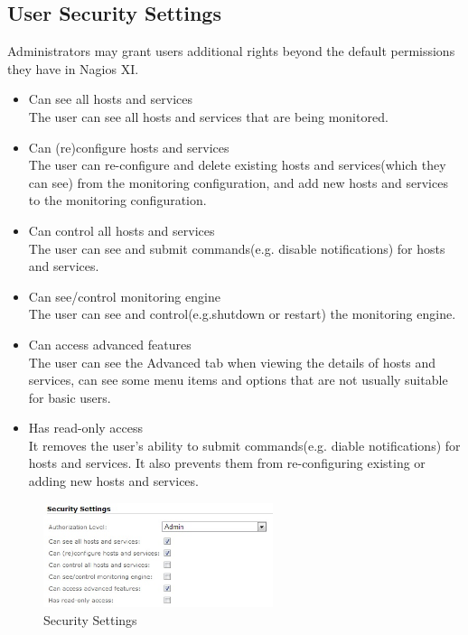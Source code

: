 \subsection{User Security Settings}
Administrators may grant users additional rights beyond the default permissions they have in Nagios XI.
\begin{itemize}
\item Can see all hosts and services \\
The user can see all hosts and services that are being monitored.
\item Can (re)configure hosts and services \\
The user can re-configure and delete existing hosts and services(which they can see) from the monitoring configuration, and add new hosts and services to the monitoring configuration.
\item Can control all hosts and services \\
The user can see and submit commands(e.g. disable notifications) for hosts and services.
\item Can see/control monitoring engine \\
The user can see and control(e.g.shutdown or restart) the monitoring engine.
\item Can access advanced features \\
The user can see the Advanced tab when viewing the details of hosts and services, can see some menu items and options that are not usually suitable for basic users. 
\item Has read-only access \\
It removes the user's ability to submit commands(e.g. diable notifications) for hosts and services. It also prevents them from re-configuring existing or adding new hosts and services.
\end{itemize}
\begin{figure}[htp]
\centering
\includegraphics[width=0.6\textwidth]{Christof/Bilder/Security}
\caption{Security Settings}
\label{fig:SecuritySettings}
\end{figure}